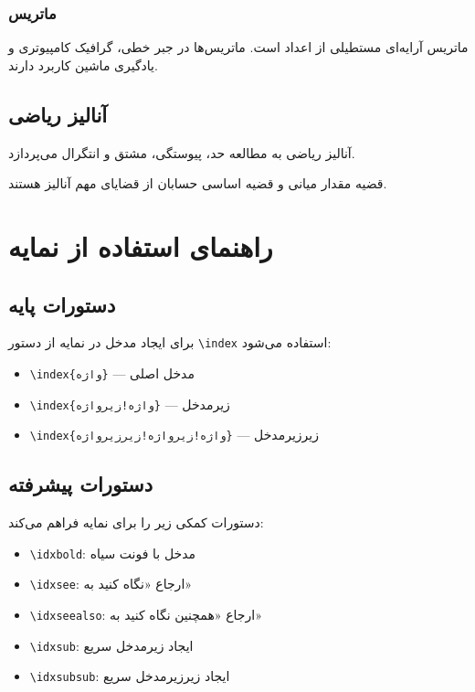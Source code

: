\documentclass{matinbook}
\begin{document}
\subsection{ماتریس}

ماتریس آرایه‌ای مستطیلی
از اعداد است. ماتریس‌ها
در جبر خطی،
گرافیک کامپیوتری
و یادگیری ماشین
کاربرد دارند.

\section{آنالیز ریاضی}

آنالیز ریاضی به مطالعه
حد، پیوستگی،
مشتق و انتگرال
می‌پردازد.

قضیه مقدار میانی
و قضیه اساسی حسابان
از قضایای مهم آنالیز هستند.

\chapter{راهنمای استفاده از نمایه}

\section{دستورات پایه}

برای ایجاد مدخل در نمایه از دستور
\texttt{\textbackslash index} استفاده می‌شود:

\begin{itemize}
    \item \texttt{\textbackslash index\{واژه\}}
    --- مدخل اصلی
    \item \texttt{\textbackslash index\{واژه!زیرواژه\}}
    --- زیرمدخل
    \item \texttt{\textbackslash index\{واژه!زیرواژه!زیرزیرواژه\}}
    --- زیرزیرمدخل
\end{itemize}

\section{دستورات پیشرفته}

 دستورات کمکی زیر را برای نمایه
فراهم می‌کند:

\begin{itemize}
    \item \texttt{\textbackslash idxbold}:
    مدخل با فونت سیاه
    \item \texttt{\textbackslash idxsee}:
    ارجاع «نگاه کنید به»
    \item \texttt{\textbackslash idxseealso}:
    ارجاع «همچنین نگاه کنید به»
    \item \texttt{\textbackslash idxsub}:
    ایجاد زیرمدخل سریع
    \item \texttt{\textbackslash idxsubsub}:
    ایجاد زیرزیرمدخل سریع
\end{itemize}
\end{document}
